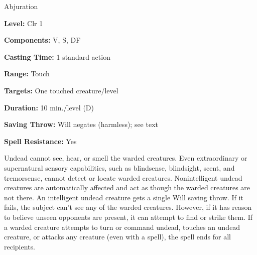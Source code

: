
Abjuration

\textbf{Level:} Clr 1

\textbf{Components:} V, S, DF

\textbf{Casting Time:} 1 standard action

\textbf{Range:} Touch

\textbf{Targets:} One touched creature/level

\textbf{Duration:} 10 min./level (D)

\textbf{Saving Throw:} Will negates (harmless); see text

\textbf{Spell Resistance:} Yes

Undead cannot see, hear, or smell the warded creatures. Even extraordinary or supernatural 
sensory capabilities, such as blindsense, blindsight, scent, and tremorsense, cannot 
detect or locate warded creatures. Nonintelligent undead creatures are automatically 
affected and act as though the warded creatures are not there. An intelligent undead 
creature gets a single Will saving throw. If it fails, the subject can't see any 
of the warded creatures. However, if it has reason to believe unseen opponents 
are present, it can attempt to find or strike them. If a warded creature attempts 
to turn or command undead, touches an undead creature, or attacks any creature 
(even with a spell), the spell ends for all recipients.

